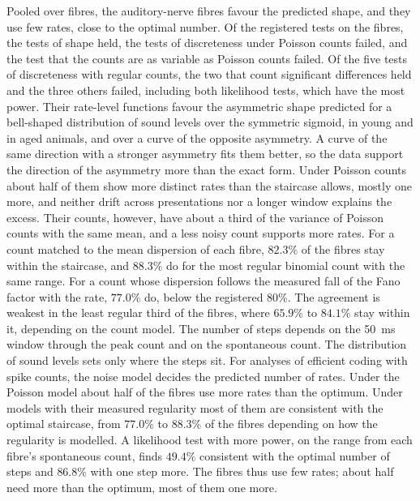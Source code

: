 Pooled over fibres, the auditory-nerve fibres favour the predicted shape, and they use few rates, close to the optimal number. Of the registered
tests on the fibres, the tests of shape held, the tests of discreteness under Poisson counts failed, and the test that the counts are
as variable as Poisson counts failed. Of the five tests of discreteness with regular counts, the two that count significant
differences held and the three others failed, including both likelihood tests, which have the most power. Their rate-level functions favour the asymmetric shape predicted for a bell-shaped distribution of sound levels over the
symmetric sigmoid, in young and in aged animals, and over a curve of the opposite asymmetry. A curve of the same direction with a
stronger asymmetry fits them better, so the data support the direction of the asymmetry more than the exact form. Under Poisson counts about half of them show more distinct rates than the staircase
allows, mostly one more, and neither drift across presentations nor a longer window explains the excess. Their counts, however, have
about a third of the variance of Poisson counts with the same mean, and a less noisy count supports more rates. For a count matched to the mean dispersion
of each fibre, $82.3\%$ of the fibres stay within the staircase, and $88.3\%$ do for the most regular binomial count
with the same range. For a count whose dispersion follows the measured fall of the Fano factor with the rate, $77.0\%$ do, below the
registered $80\%$. The agreement is weakest in the least regular third of the fibres, where $65.9\%$ to $84.1\%$ stay within it,
depending on the count model. The number of steps depends on
the 50~ms window through the peak count and on the spontaneous count. The distribution of sound levels sets only where the steps sit. For analyses of efficient coding with spike counts, the noise model decides the predicted number
of rates. Under the Poisson model about half of the fibres use more rates than the optimum. Under models with their measured
regularity most of them are consistent with the optimal staircase, from $77.0\%$ to $88.3\%$ of the fibres depending on how the
regularity is modelled. A likelihood test with more power, on the range from each fibre's spontaneous count, finds $49.4\%$ consistent with the optimal
number of steps and $86.8\%$ with one step more. The fibres thus use few rates; about half need more than the optimum, most of them one more.

